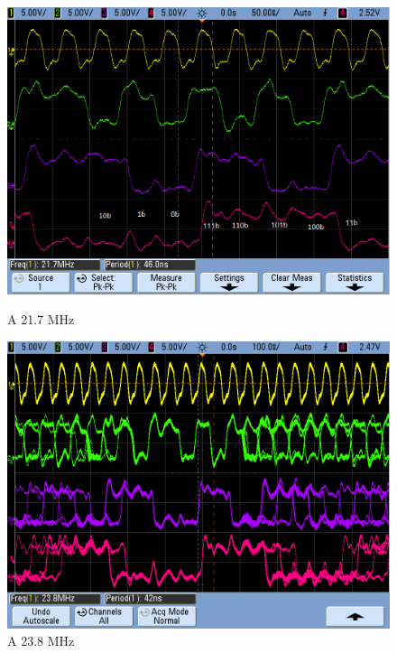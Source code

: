 \begin{figure}[H]
\begin{center}
\begin{minipage}[b]{0.4\textwidth}
  \label{7_fig5}
  \end{minipage}
  \begin{minipage}[b]{0.4\textwidth}
    \begin{center}
  		\includegraphics[scale=0.2]{ejercicio7/imagenes/async3.png}
	\end{center}
  \caption{A 21.7 MHz}
  \label{7_fig6}
 \end{minipage}
   \begin{minipage}[b]{0.4\textwidth}
    \begin{center}
  		\includegraphics[scale=0.2]{ejercicio7/imagenes/async4.png}
	\end{center}
  \caption{A 23.8 MHz}
  \label{7_fig7}
 \end{minipage}
\end{center}
\end{figure}

